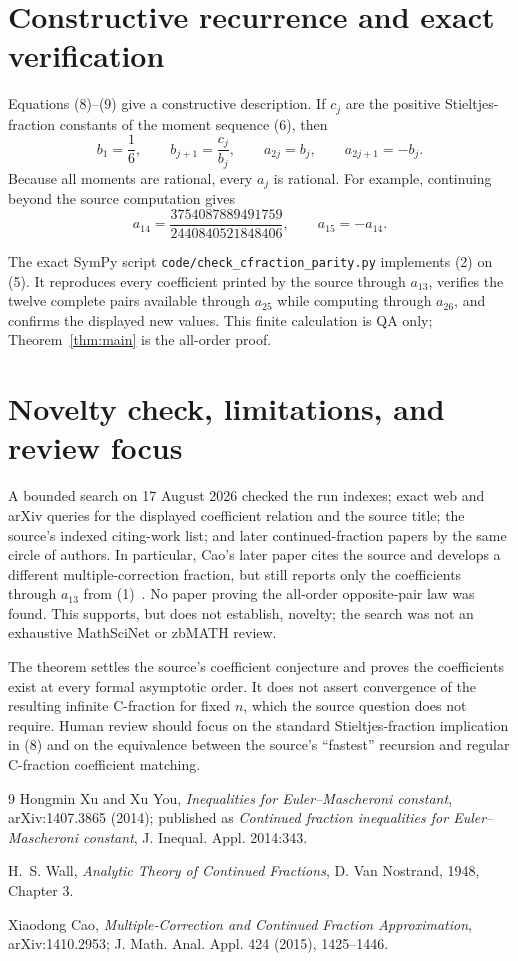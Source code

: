 \documentclass[11pt]{article}
\begin{document}
\section{Constructive recurrence and exact verification}

Equations (8)--(9) give a constructive description.  If \(c_j\) are the
positive Stieltjes-fraction constants of the moment sequence (6), then
\[
 b_1=\frac16,
 \qquad b_{j+1}=\frac{c_j}{b_j},
 \qquad a_{2j}=b_j,
 \qquad a_{2j+1}=-b_j.                                    \tag{10}
\]
Because all moments are rational, every \(a_j\) is rational.  For example,
continuing beyond the source computation gives
\[
 a_{14}=\frac{3754087889491759}{2440840521848406},
 \qquad a_{15}=-a_{14}.
\]

The exact SymPy script \texttt{code/check\_cfraction\_parity.py} implements
(2) on (5).  It reproduces every coefficient printed by the source through
\(a_{13}\), verifies the twelve complete pairs available through \(a_{25}\)
while computing through \(a_{26}\), and confirms the displayed new values.
This finite calculation is QA only; Theorem~\ref{thm:main} is the all-order
proof.

\section{Novelty check, limitations, and review focus}

A bounded search on 17 August 2026 checked the run indexes; exact web and
arXiv queries for the displayed coefficient relation and the source title;
the source's indexed citing-work list; and later continued-fraction papers by
the same circle of authors.  In particular, Cao's later paper cites the source
and develops a different multiple-correction fraction, but still reports only
the coefficients through \(a_{13}\) from (1)~\cite{Cao}.  No paper proving the
all-order opposite-pair law was found.  This supports, but does not establish,
novelty; the search was not an exhaustive MathSciNet or zbMATH review.

The theorem settles the source's coefficient conjecture and proves the
coefficients exist at every formal asymptotic order.  It does not assert
convergence of the resulting infinite C-fraction for fixed \(n\), which the
source question does not require.  Human review should focus on the standard
Stieltjes-fraction implication in (8) and on the equivalence between the
source's ``fastest'' recursion and regular C-fraction coefficient matching.

\begin{thebibliography}{9}
Hongmin Xu and Xu You,
\emph{Inequalities for Euler--Mascheroni constant},
arXiv:1407.3865 (2014); published as
\emph{Continued fraction inequalities for Euler--Mascheroni constant},
J. Inequal. Appl. 2014:343.

H.~S. Wall,
\emph{Analytic Theory of Continued Fractions},
D. Van Nostrand, 1948, Chapter 3.

Xiaodong Cao,
\emph{Multiple-Correction and Continued Fraction Approximation},
arXiv:1410.2953; J. Math. Anal. Appl. 424 (2015), 1425--1446.
\end{thebibliography}
\end{document}
